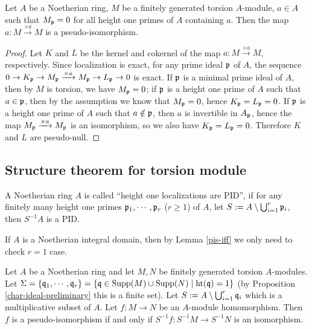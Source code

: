 \begin{prop}
\label{smul-is-pis}
\leanok
Let $A$ be a Noetherian ring, $M$ be a finitely generated torsion $A$-module,
$a\in A$ such that $M_{\mathfrak{p}}=0$ for all height one primes of $A$ containing $a$.
Then the map $a:M\xrightarrow{\times a}M$ is a pseudo-isomorphism.
\end{prop}

\begin{proof}
\leanok
Let $K$ and $L$ be the kernel and cokernel of the map
$a:M\xrightarrow{\times a}M$, respectively.
Since localization is exact, for any prime ideal ${\mathfrak{p}}$ of $A$,
the sequence $0\to K_{\mathfrak{p}}\to M_{\mathfrak{p}}\xrightarrow{\times a}M_{\mathfrak{p}}\to L_{\mathfrak{p}}\to 0$
is exact.
If ${\mathfrak{p}}$ is a minimal prime ideal of $A$, then by $M$ is torsion,
we have $M_{\mathfrak{p}}=0$; if ${\mathfrak{p}}$ is a height one prime of $A$
such that $a\in{\mathfrak{p}}$, then by the assumption we know that $M_{\mathfrak{p}}=0$,
hence $K_{\mathfrak{p}}=L_{\mathfrak{p}}=0$.
If ${\mathfrak{p}}$ is a height one prime of $A$
such that $a\notin{\mathfrak{p}}$, then $a$ is invertible in $A_{\mathfrak{p}}$,
hence the map $M_{\mathfrak{p}}\xrightarrow{\times a}M_{\mathfrak{p}}$ is an isomorphism,
so we also have $K_{\mathfrak{p}}=L_{\mathfrak{p}}=0$.
Therefore $K$ and $L$ are pseudo-null.
\end{proof}

\subsection{Structure theorem for torsion module}

\begin{definition}
\label{ht-1-localization-is-PID}
\leanok
A Noetherian ring $A$ is called
``height one localizations are PID'', if
for any finitely many height one primes ${\mathfrak{p}}_1,\cdots,{\mathfrak{p}}_r$ ($r\geq 1$) of $A$,
let $S:=A\setminus\bigcup_{i=1}^r{\mathfrak{p}}_i$, then $S^{-1}A$ is a PID.
\end{definition}

If $A$ is a Noetherian integral domain, then by Lemma \ref{pis-iff} we
only need to check $r=1$ case.

\begin{lem}
\label{pis-iff}
\leanok
Let $A$ be a Noetherian ring and let
$M,N$ be finitely generated torsion $A$-modules.
Let $\Sigma=\{{\mathfrak{q}}_1,\cdots,{\mathfrak{q}}_r\}
=\{{\mathfrak{q}}\in{\mathrm{Supp}}(M)\cup{\mathrm{Supp}}(N)\mid{\mathrm{ht}}({\mathfrak{q}})=1\}$
(by Proposition \ref{char-ideal-preliminary} this is a finite set).
Let $S:=A\setminus\bigcup_{i=1}^r{\mathfrak{q}}_i$ which is a multiplicative subset of $A$.
Let $f:M\to N$ be an $A$-module homomorphism.
Then $f$ is a pseudo-isomorphism if and only if $S^{-1}f:S^{-1}M\to S^{-1}N$
is an isomorphism.
\end{lem}

